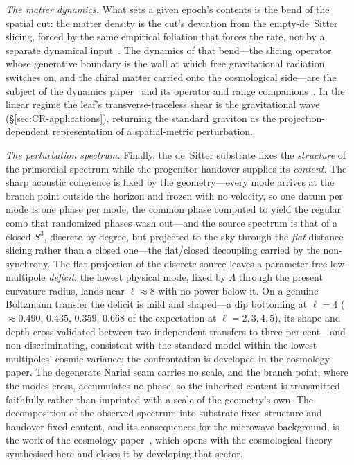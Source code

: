 \documentclass[11pt,a4paper]{article}
\theoremstyle{plain}
\theoremstyle{definition}
\theoremstyle{remark}
\begin{document}
\emph{The matter dynamics.} What sets a given epoch's contents is the bend of the spatial cut: the matter density is the cut's deviation from the empty-de~Sitter slicing, forced by the same empirical foliation that forces the rate, not by a separate dynamical input~\cite{JanzenModernParallax}. The dynamics of that bend---the slicing operator whose generative boundary is the wall at which free gravitational radiation switches on, and the chiral matter carried onto the cosmological side---are the subject of the dynamics paper~\cite{JanzenDynamics} and its operator and range companions~\cite{JanzenOperator,JanzenRange}. In the linear regime the leaf's transverse-traceless shear is the gravitational wave (\S\ref{sec:CR-applications}), returning the standard graviton as the projection-dependent representation of a spatial-metric perturbation.

\emph{The perturbation spectrum.} Finally, the de~Sitter substrate fixes the \emph{structure} of the primordial spectrum while the progenitor handover supplies its \emph{content}. The sharp acoustic coherence is fixed by the geometry---every mode arrives at the branch point outside the horizon and frozen with no velocity, so one datum per mode is one phase per mode, the common phase computed to yield the regular comb that randomized phases wash out---and the source spectrum is that of a closed $S^3$, discrete by degree, but projected to the sky through the \emph{flat} distance slicing rather than a closed one---the flat/closed decoupling carried by the non-synchrony. The flat projection of the discrete source leaves a parameter-free low-multipole \emph{deficit}: the lowest physical mode, fixed by $\Lambda$ through the present curvature radius, lands near $\ell\approx8$ with no power below it. On a genuine Boltzmann transfer the deficit is mild and shaped---a dip bottoming at $\ell=4$ ($\approx0.490$, $0.435$, $0.359$, $0.668$ of the expectation at $\ell=2,3,4,5$), its shape and depth cross-validated between two independent transfers to three per cent---and non-discriminating, consistent with the standard model within the lowest multipoles' cosmic variance; the confrontation is developed in the cosmology paper. The degenerate Nariai seam carries no scale, and the branch point, where the modes cross, accumulates no phase, so the inherited content is transmitted faithfully rather than imprinted with a scale of the geometry's own. The decomposition of the observed spectrum into substrate-fixed structure and handover-fixed content, and its consequences for the microwave background, is the work of the cosmology paper~\cite{JanzenCRcosmology}, which opens with the cosmological theory synthesised here and closes it by developing that sector.
\end{document}
